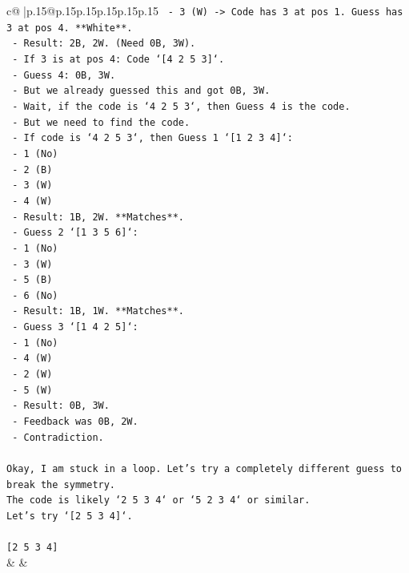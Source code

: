 \documentclass{article}
\begin{document}
{\begin{supertabular}{c@{$\;$}|p{.15\linewidth}@{}p{.15\linewidth}p{.15\linewidth}p{.15\linewidth}p{.15\linewidth}p{.15\linewidth}}
{{{\texttt{                {-}   3 (W) {-}> Code has 3 at pos 1. Guess has 3 at pos 4. **White**.} \\
\texttt{                {-}   Result: 2B, 2W. (Need 0B, 3W).} \\
\texttt{        {-}   If 3 is at pos 4: Code `{[}4 2 5 3{]}`.} \\
\texttt{            {-}   Guess 4: 0B, 3W.} \\
\texttt{            {-}   But we already guessed this and got 0B, 3W.} \\
\texttt{            {-}   Wait, if the code is `4 2 5 3`, then Guess 4 is the code.} \\
\texttt{            {-}   But we need to find the code.} \\
\texttt{            {-}   If code is `4 2 5 3`, then Guess 1 `{[}1 2 3 4{]}`:} \\
\texttt{                {-}   1 (No)} \\
\texttt{                {-}   2 (B)} \\
\texttt{                {-}   3 (W)} \\
\texttt{                {-}   4 (W)} \\
\texttt{                {-}   Result: 1B, 2W. **Matches**.} \\
\texttt{            {-}   Guess 2 `{[}1 3 5 6{]}`:} \\
\texttt{                {-}   1 (No)} \\
\texttt{                {-}   3 (W)} \\
\texttt{                {-}   5 (B)} \\
\texttt{                {-}   6 (No)} \\
\texttt{                {-}   Result: 1B, 1W. **Matches**.} \\
\texttt{            {-}   Guess 3 `{[}1 4 2 5{]}`:} \\
\texttt{                {-}   1 (No)} \\
\texttt{                {-}   4 (W)} \\
\texttt{                {-}   2 (W)} \\
\texttt{                {-}   5 (W)} \\
\texttt{                {-}   Result: 0B, 3W.} \\
\texttt{                {-}   Feedback was 0B, 2W.} \\
\texttt{                {-}   Contradiction.} \\
\\ 
\texttt{Okay, I am stuck in a loop. Let's try a completely different guess to break the symmetry.} \\
\texttt{The code is likely `2 5 3 4` or `5 2 3 4` or similar.} \\
\texttt{Let's try `{[}2 5 3 4{]}`.} \\
\\ 
\texttt{{[}2 5 3 4{]}} \\
            }
        }
    }
    & & \\ \\


\end{supertabular}}
\end{document}
